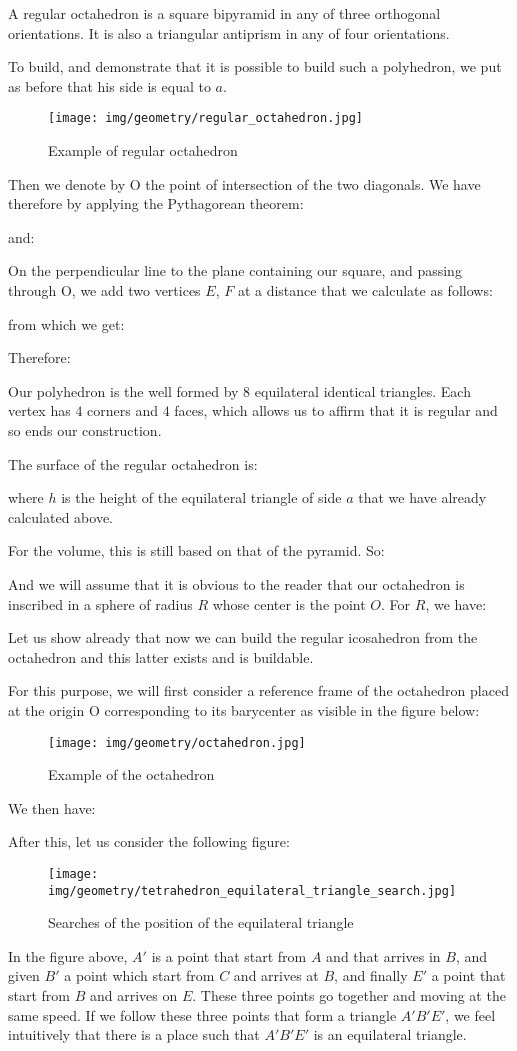 {	 A regular octahedron is a square bipyramid in any of three orthogonal orientations. It is also a triangular antiprism in any of four orientations.
	
	To build, and demonstrate that it is possible to build such a polyhedron, we put as before that his side is equal to $a$.
	\begin{figure}[H]
		\centering
		\texttt{[image: img/geometry/regular\_octahedron.jpg]}
		\caption{Example of regular octahedron }
	\end{figure}
	Then we denote by O the point of intersection of the two diagonals. We have therefore by applying the Pythagorean theorem:
	
	and:
	
	On the perpendicular line to the plane containing our square, and passing through O, we add two vertices $E$, $F$ at a distance that we calculate as follows:
	
	from which we get:
	
	Therefore:
	
	Our polyhedron is the well formed by $8$ equilateral identical triangles. Each vertex has $4$ corners and $4$ faces, which allows us to affirm that it is regular and so ends our construction.
	
	The surface of the regular octahedron is:
	
	where $h$ is the height of the equilateral triangle of side $a$ that we have already calculated above. 

	For the volume, this is still based on that of the pyramid. So:
	
	And we will assume that it is obvious to the reader that our octahedron is inscribed in a sphere of radius $R$ whose center is the point $O$. For $R$, we have:
	
	Let us show already that now we can build the regular icosahedron from the octahedron and this latter exists and is buildable.

	For this purpose, we will first consider a reference frame of the octahedron placed at the origin O corresponding to its barycenter as visible in the figure below:
	\begin{figure}[H]
		\centering
		\texttt{[image: img/geometry/octahedron.jpg]}
		\caption{Example of the octahedron}
	\end{figure}
	We then have:
	
	After this, let us consider the following figure:
	\begin{figure}[H]
		\centering
		\texttt{[image: img/geometry/tetrahedron\_equilateral\_triangle\_search.jpg]}
		\caption{Searches of the position of the equilateral triangle}
	\end{figure}
	In the figure above, $A'$ is a point that start from $A$ and that arrives in $B$, and given $B'$ a point which start from $C$ and arrives at $B$, and finally $E'$ a point that start from $B$ and arrives on $E$. These three points go together and moving at the same speed. If we follow these three points that form a triangle $A'B'E'$, we feel intuitively that there is a place such that $A'B'E'$ is an equilateral triangle.
	
}
